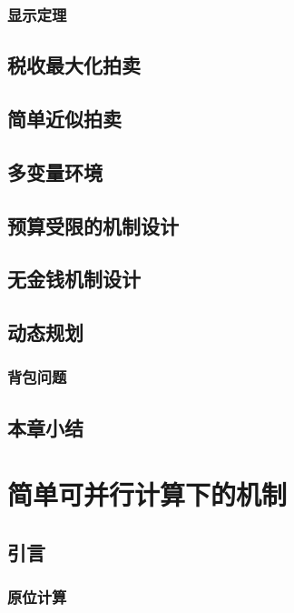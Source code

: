 \documentclass[promaster]{thesis-uestc}
\begin{document}
    \subsection{显示定理}

\section{税收最大化拍卖}

\section{简单近似拍卖}

\section{多变量环境}

\section{预算受限的机制设计}

\section{无金钱机制设计}

\section{动态规划}

\subsection{背包问题}


\section{本章小结}


\chapter{简单可并行计算下的机制}

\section{引言}
\subsection{原位计算}
\end{document}
